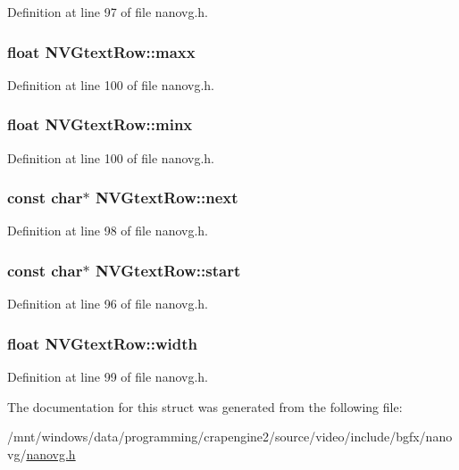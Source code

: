 Definition at line 97 of file nanovg.\+h.

\hypertarget{struct_n_v_gtext_row_a022c194fd146e8cf80be30a183f64871}{
\subsubsection[{maxx}]{\setlength{\rightskip}{0pt plus 5cm}float N\+V\+Gtext\+Row\+::maxx}}\label{struct_n_v_gtext_row_a022c194fd146e8cf80be30a183f64871}


Definition at line 100 of file nanovg.\+h.

\hypertarget{struct_n_v_gtext_row_ace83ebb3ae1a6c14d7104284d4813d7c}{
\subsubsection[{minx}]{\setlength{\rightskip}{0pt plus 5cm}float N\+V\+Gtext\+Row\+::minx}}\label{struct_n_v_gtext_row_ace83ebb3ae1a6c14d7104284d4813d7c}


Definition at line 100 of file nanovg.\+h.

\hypertarget{struct_n_v_gtext_row_a593a3eec246cf91ddad5617132b3d916}{
\subsubsection[{next}]{\setlength{\rightskip}{0pt plus 5cm}const char$\ast$ N\+V\+Gtext\+Row\+::next}}\label{struct_n_v_gtext_row_a593a3eec246cf91ddad5617132b3d916}


Definition at line 98 of file nanovg.\+h.

\hypertarget{struct_n_v_gtext_row_ae0d868be9f65a22eba6fc01f969aea0b}{
\subsubsection[{start}]{\setlength{\rightskip}{0pt plus 5cm}const char$\ast$ N\+V\+Gtext\+Row\+::start}}\label{struct_n_v_gtext_row_ae0d868be9f65a22eba6fc01f969aea0b}


Definition at line 96 of file nanovg.\+h.

\hypertarget{struct_n_v_gtext_row_a94481448fed11625d1aeb56531ecf3a0}{
\subsubsection[{width}]{\setlength{\rightskip}{0pt plus 5cm}float N\+V\+Gtext\+Row\+::width}}\label{struct_n_v_gtext_row_a94481448fed11625d1aeb56531ecf3a0}


Definition at line 99 of file nanovg.\+h.



The documentation for this struct was generated from the following file\+:\begin{DoxyCompactItemize}
\item 
/mnt/windows/data/programming/crapengine2/source/video/include/bgfx/nanovg/\hyperlink{nanovg_8h}{nanovg.\+h}\end{DoxyCompactItemize}

